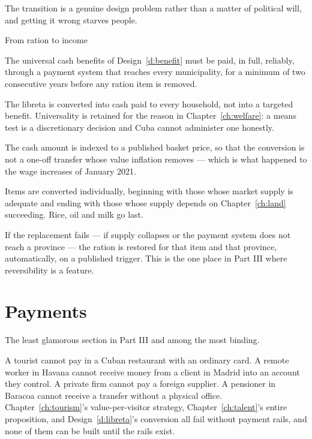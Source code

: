 The transition is a genuine design problem rather than a matter of political
will, and getting it wrong starves people.

\begin{design}{From ration to income}
\label{d:libreta}
\begin{rules}
 The universal cash
benefits of Design~\ref{d:benefit} must be paid, in full, reliably, through a
payment system that reaches every municipality, for a minimum of two
consecutive years before any ration item is removed.

 The libreta is converted into cash paid to
every household, not into a targeted benefit. Universality is retained for the
reason in Chapter~\ref{ch:welfare}: a means test is a discretionary decision and
Cuba cannot administer one honestly.

 The cash amount is indexed to a published basket price, so that
the conversion is not a one-off transfer whose value inflation removes --- which
is what happened to the wage increases of January 2021.

 Items are converted individually, beginning with those
whose market supply is adequate and ending with those whose supply depends on
Chapter~\ref{ch:land} succeeding. Rice, oil and milk go last.

 If the replacement fails --- if supply collapses or the
payment system does not reach a province --- the ration is restored for that
item and that province, automatically, on a published trigger. This is the one
place in Part III where reversibility is a feature.
\end{rules}
\end{design}

\section{Payments}

The least glamorous section in Part III and among the most binding.

A tourist cannot pay in a Cuban restaurant with an ordinary card. A remote worker
in Havana cannot receive money from a client in Madrid into an account they
control. A private firm cannot pay a foreign supplier. A pensioner in Baracoa
cannot receive a transfer without a physical office. Chapter~\ref{ch:tourism}'s
value-per-visitor strategy, Chapter~\ref{ch:talent}'s entire proposition, and
Design~\ref{d:libreta}'s conversion all fail without payment rails, and none of
them can be built until the rails exist.

